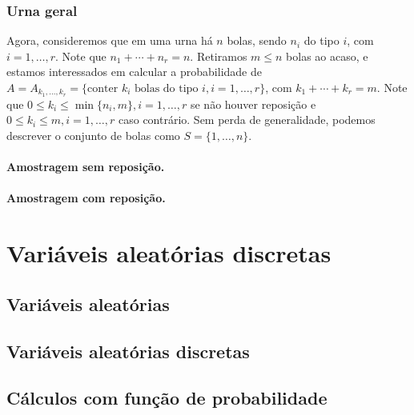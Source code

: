 \documentclass[../Notas.tex]{subfiles}
\begin{document}
\subsubsection{Urna geral}
Agora, consideremos que em uma urna há $n$ bolas, sendo $n_i$ do tipo $i$, com $i = 1, \dots, r$. Note que $n_1 + \cdots + n_r = n$. Retiramos $m\leq n$ bolas ao acaso, e estamos interessados em calcular a probabilidade de $A = A_{k_1, \dots, k_r} = \{ \text{conter } k_i \text{ bolas do tipo } i, i = 1, \dots, r \}$, com $k_1 + \cdots + k_r = m$. Note que $0\leq k_i\leq\min\{n_i, m\}, i=1, \dots, r$ se não houver reposição e $0\leq k_i\leq m, i=1, \dots, r$ caso contrário. Sem perda de generalidade, podemos descrever o conjunto de bolas como $S = \{1, \dots, n \}$.

\paragraph{Amostragem sem reposição.}

\paragraph{Amostragem com reposição.}


\section{Variáveis aleatórias discretas}

\subsection{Variáveis aleatórias}

\subsection{Variáveis aleatórias discretas}

\subsection{Cálculos com função de probabilidade}
\end{document}
